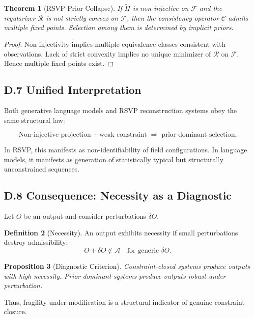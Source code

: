 \documentclass[12pt, oneside]{article}
\theoremstyle{plain}
\newtheorem{theorem}{Theorem}[section]
\newtheorem{proposition}[theorem]{Proposition}
\theoremstyle{definition}
\newtheorem{definition}[theorem]{Definition}
\theoremstyle{remark}
\begin{document}
\begin{theorem}[RSVP Prior Collapse]
If $\widetilde{\Pi}$ is non-injective on $\mathcal{F}$ and the regularizer $\mathcal{R}$ is not strictly convex on $\mathcal{F}$, then the consistency operator $\mathcal{C}$ admits multiple fixed points. Selection among them is determined by implicit priors.
\end{theorem}

\begin{proof}
Non-injectivity implies multiple equivalence classes consistent with observations. Lack of strict convexity implies no unique minimizer of $\mathcal{R}$ on $\mathcal{F}$. Hence multiple fixed points exist.
\end{proof}

\subsection{D.7 Unified Interpretation}

Both generative language models and RSVP reconstruction systems obey the same structural law:

\[
\text{Non-injective projection} + \text{weak constraint} \;\Rightarrow\; \text{prior-dominant selection}.
\]

In RSVP, this manifests as non-identifiability of field configurations. In language models, it manifests as generation of statistically typical but structurally unconstrained sequences.

\subsection{D.8 Consequence: Necessity as a Diagnostic}

Let $O$ be an output and consider perturbations $\delta O$.

\begin{definition}[Necessity]
An output exhibits necessity if small perturbations destroy admissibility:
\[
O + \delta O \notin \mathcal{A} \quad \text{for generic } \delta O.
\]
\end{definition}

\begin{proposition}[Diagnostic Criterion]
Constraint-closed systems produce outputs with high necessity. Prior-dominant systems produce outputs robust under perturbation.
\end{proposition}

Thus, fragility under modification is a structural indicator of genuine constraint closure.
\end{document}
